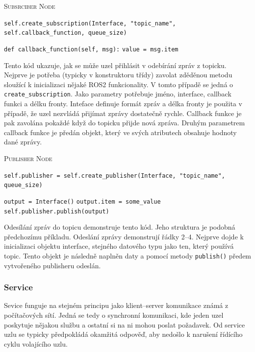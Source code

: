\begin{algorithm}[h!]
	\label{}
	\caption{\textsc{Subsrciber Node}}
	
	\DontPrintSemicolon
	\SetAlgoNoLine
	\SetNlSty{}{}{:}
	\SetNlSkip{-1.1em}
	
	\BlankLine \Indp\Indpp
	\texttt{self.create\_subscription(Interface, "topic\_name", self.callback\_function, queue\_size)}\;
	
	\BlankLine
	\texttt{def callback\_function(self, msg):}\;
	\Indp\Indp
	\texttt{value = msg.item}\;
\end{algorithm}
Tento kód ukazuje, jak se může uzel přihlásit v odebírání zpráv z topicku. Nejprve je potřeba (typicky v konstruktoru třídy) zavolat zděděnou metodu sloužící k inicializaci nějaké ROS2 funkcionality. V tomto případě se jedná o \verb|create_subscription|. Jako parametry potřebuje jméno, interface, callback funkci a délku fronty. Inteface definuje formát zpráv a délka fronty je použita v případě, že uzel nezvládá přijímat zprávy dostatečně rychle. Callback funkce je pak zavolána pokaždé když do topicku přijde nová zpráva. Druhým parametrem callback funkce je předán objekt, který ve svých atributech obsahuje hodnoty dané zprávy. \cite{ros2_documentation}

\begin{algorithm}[h!]
	\label{}
	\caption{\textsc{Publisher Node}}
	
	\DontPrintSemicolon
	\SetAlgoNoLine
	\SetAlgoNlRelativeSize{-1}
	\SetNlSty{}{}{:}
	\SetNlSkip{-1.1em}
	
	\BlankLine \Indp\Indpp
	\texttt{self.publisher = self.create\_publisher(Interface, "topic\_name", queue\_size)}\;
	
	\BlankLine
	\texttt{output = Interface()}\;
	\texttt{output.item = some\_value}\;
	\texttt{self.publisher.publish(output)}\;
\end{algorithm}
Odesílání zpráv do topicu demonstruje tento kód. Jeho struktura je podobná předchozímu příkladu. Odeslání zprávy demonstrují řádky 2--4. Nejprve dojde k inicializaci objektu interface, stejného datového typu jako ten, který používá topic. Tento objekt je následně naplněn daty a pomocí metody \verb|publish()| předem vytvořeného publisheru odeslán. \cite{ros2_documentation}

\subsubsection*{Service}
Sevice funguje na stejném principu jako klient--server komunikace známá z počítačových sítí. Jedná se tedy o synchronní komunikaci, kde jeden uzel poskytuje nějakou službu a ostatní si na ni mohou poslat požadavek. Od service uzlu se typicky předpokládá okamžitá odpověď, aby nedošlo k narušení řídícího cyklu volajícího uzlu. \cite{ros2_introduction}
\newpage

